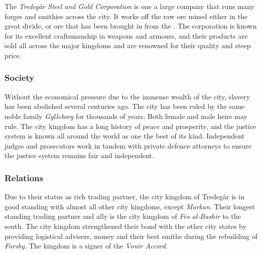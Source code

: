 The \emph{Tredegår Steel and Gold Corporation} is one a large company that
runs many forges and smithies across the city. It works off the raw ore mined
either in the great divide, or ore that has been brought in from the
. The corporation is known for its excellent
craftsmanship in weapons and armours, and their products are sold all across
the major kingdoms and are renowned for their quality and steep price.

\subsubsection*{Society}

Without the economical pressure due to the immense wealth of the city, slavery
has been abolished several centuries ago. The city has been ruled by the same
noble family \emph{Gylleborg} for thousands of years. Both female and male
heirs may rule. The city kingdom has a long history of peace and prosperity,
and the justice system is known all around the world as one the best of its
kind. Independent judges and prosecutors work in tandem with private defence
attorneys to ensure the justice system remains fair and independent.

\subsubsection*{Relations}

Due to their status as rich trading partner, the city kingdom of Tredegår is
in good standing with almost all other city kingdoms, except \emph{Morkan}.
Their longest standing trading partner and ally is the city kingdom of
\emph{Fes al-Bashir} to the south. The city kingdom strengthened their bond
with the other city states by providing logistical advisers, money and
their best smiths during the rebuilding of \emph{Forsby}. The kingdom is a
signer of the \emph{Vonir Accord}.
